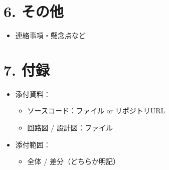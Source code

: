 \documentclass[a4paper,11pt]{ltjsarticle}
\begin{document}
\section{6. その他}

\begin{itemize}
    \item 連絡事項・懸念点など
\end{itemize}

\section{7. 付録}

\begin{itemize}
    \item 添付資料：
    \begin{itemize}
        \item ソースコード：ファイル or リポジトリURL
        \item 回路図 / 設計図：ファイル
    \end{itemize}
    \item 添付範囲：
    \begin{itemize}
        \item 全体 / 差分（どちらか明記）
    \end{itemize}
\end{itemize}
\end{document}
